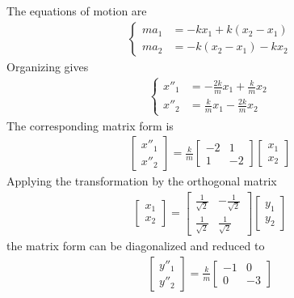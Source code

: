 \begin{Answer}
The equations of motion are
\begin{align*}
\left\{\begin{alignedat}{1}
ma_1 &= -kx_1 + k(x_2 - x_1)\\
ma_2 &= -k(x_2 - x_1) - kx_2
\end{alignedat}\right.
\end{align*}
Organizing gives
\begin{align*}
\left\{\begin{alignedat}{1}
x''_1 &= -\frac{2k}{m}x_1 + \frac{k}{m}x_2\\
x''_2 &= \frac{k}{m}x_1 - \frac{2k}{m}x_2
\end{alignedat}\right.
\end{align*}
The corresponding matrix form is
\begin{align*}
\begin{bmatrix}
x''_1\\
x''_2    
\end{bmatrix}
=
\frac{k}{m}
\begin{bmatrix}
-2 & 1\\
1 & -2
\end{bmatrix}
\begin{bmatrix}
x_1\\
x_2
\end{bmatrix}
\end{align*}
Applying the transformation by the orthogonal matrix
\begin{align*}
\begin{bmatrix}
x_1\\
x_2
\end{bmatrix}
=
\begin{bmatrix}
\frac{1}{\sqrt{2}} & -\frac{1}{\sqrt{2}}\\
\frac{1}{\sqrt{2}} & \frac{1}{\sqrt{2}}
\end{bmatrix}
\begin{bmatrix}
y_1\\
y_2
\end{bmatrix}
\end{align*}
the matrix form can be diagonalized and reduced to
\begin{align*}
\begin{bmatrix}
y''_1\\
y''_2
\end{bmatrix}
=
\frac{k}{m}
\begin{bmatrix}
-1 & 0\\
0 & -3
\end{bmatrix}

\end{align*}
\end{Answer}
